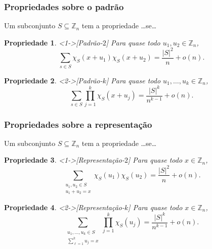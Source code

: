 \documentclass{beamer}
\def\MMZ{\mathbb{Z}} %
\def\MMp{\mathrm{.}} %
\def\cardi#1{\lvert #1 \rvert} %
\theoremstyle{teoaxicorlem}
\newtheorem{Propr}{Propriedade}
\theoremstyle{defnotnom}
\begin{document}
\begin{frame}
  \frametitle{Propriedades sobre o padrão}
  Um subconjunto $S\subseteq\MMZ_n$ tem a propriedade \dots se\dots
  \begin{Propr}<1->[Padrão-$2$]
    Para quase todo $u_1,u_2\in\MMZ_n$,
    \begin{equation*}
      \sum_{s\in S}\chi_S(x+u_1)\chi_S(x+u_2) =
      \frac{\cardi{S}^2}{n} + o(n)\MMp
    \end{equation*}
  \end{Propr}
  \vfill
  \begin{Propr}<2->[Padrão-$k$]
    Para quase todo $u_1,\dotsc,u_k\in\MMZ_n$,
    \begin{equation*}
      \sum_{s\in S}\prod_{j=1}^k\chi_S(x+u_j) =
      \frac{\cardi{S}^k}{n^{k-1}} + o(n)\MMp
    \end{equation*}
  \end{Propr}
\end{frame}

\begin{frame}
  \frametitle{Propriedades sobre a representação}
  \footnotesize
  Um subconjunto $S\subseteq\MMZ_n$ tem a propriedade \dots se\dots
  \begin{Propr}<1->[Representação-$2$]
    \footnotesize
    Para quase todo $x\in\MMZ_n$,
    \begin{equation*}
      \sum_{\substack{u_1,u_2\in S\\u_1+u_2=x}}
      \chi_S(u_1)\chi_S(u_2) =
      \frac{\cardi{S}^2}{n} + o(n)\MMp
    \end{equation*}
  \end{Propr}
  \vfill
  \begin{Propr}<2->[Representação-$k$]
    \footnotesize
    Para quase todo $x\in\MMZ_n$,
    \begin{equation*}
      \sum_{\substack{u_1,\dotsc,u_k\in S\\\sum_{\ell=1}^ku_j=x}}
      \prod_{j=1}^k\chi_S(u_j) =
      \frac{\cardi{S}^k}{n^{k-1}} + o(n)\MMp
    \end{equation*}
  \end{Propr}
\end{frame}
\end{document}
